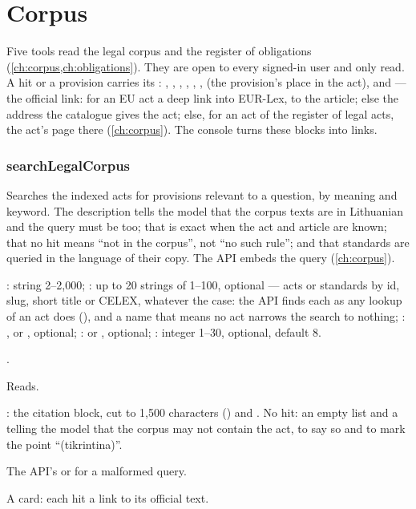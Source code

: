 \section{Corpus}\label{sec:tools:corpus}

Five tools read the legal corpus and the register of obligations (\cref{ch:corpus,ch:obligations}).
They are open to every signed-in user and only read. A hit or a provision carries its
: , , , ,
, ,  (the provision's place in the act),
 and  --- the official link: for an EU act a deep link into
EUR-Lex, to the article; else the address the catalogue gives the act; else, for an act of the
register of legal acts, the act's page there (\cref{ch:corpus}). The console turns these blocks into links.

\subsubsection{searchLegalCorpus}\label{sec:tools:searchLegalCorpus}
\begin{description}[style=multiline, leftmargin=19mm, labelwidth=17mm, labelsep=2mm,
  font=\sffamily\bfseries\footnotesize\color{ink}, itemsep=1pt, topsep=2pt, before=\raggedright]
  \item[Does] Searches the indexed acts for provisions relevant to a question, by meaning and
    keyword. The description tells the model that the corpus texts are in Lithuanian and the
    query must be too; that  is exact when the act and article are
    known; that no hit means \enquote{not in the corpus}, not \enquote{no such rule}; and that
    standards are queried in the language of their copy. The API embeds the query
    (\cref{ch:corpus}).
  \item[Input] : string 2--2,000; : up to 20 strings of 1--100,
    optional --- acts or standards by id, slug, short title or CELEX, whatever the case: the
    API finds each as any lookup of an act does (), and a name that
    means no act narrows the search to nothing; :
    ,  or , optional; :  or
    , optional; : integer 1--30, optional, default 8.
  \item[Calls] .
  \item[Kind] Reads.
  \item[Returns] : the citation block,  cut to 1,500 characters
    () and . No hit: an empty list and a  telling the
    model that the corpus may not contain the act, to say so and to mark the point
    \enquote{(tikrintina)}.
  \item[Errors] The API's  or  for a malformed query.
  \item[Console] A card: each hit a link to its official text.
\end{description}

